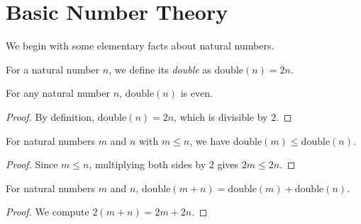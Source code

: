 
\section{Basic Number Theory}

We begin with some elementary facts about natural numbers.

\begin{definition}[Double]
\label{def:double}
For a natural number $n$, we define its \emph{double} as $\mathrm{double}(n) = 2n$.
\end{definition}

\begin{theorem}
\label{thm:double-even}
For any natural number $n$, $\mathrm{double}(n)$ is even.
\end{theorem}

\begin{proof}
By definition, $\mathrm{double}(n) = 2n$, which is divisible by $2$.
\end{proof}

\begin{theorem}
\label{thm:double-mono}
For natural numbers $m$ and $n$ with $m \le n$, we have $\mathrm{double}(m) \le \mathrm{double}(n)$.
\end{theorem}

\begin{proof}
Since $m \le n$, multiplying both sides by $2$ gives $2m \le 2n$.
\end{proof}

\begin{theorem}
\label{thm:double-add}
For natural numbers $m$ and $n$, $\mathrm{double}(m + n) = \mathrm{double}(m) + \mathrm{double}(n)$.
\end{theorem}

\begin{proof}
We compute $2(m+n) = 2m + 2n$.
\end{proof}
